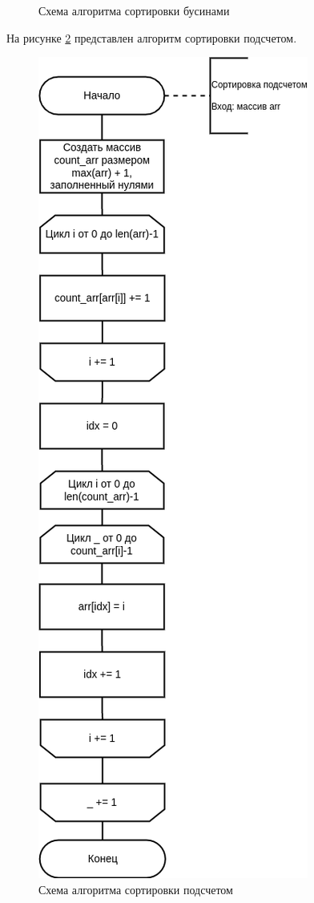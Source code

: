 \begin{figure}[H]
\begin{center}
	\end{center}
	\captionsetup{justification=centering}
	\caption{Схема алгоритма сортировки бусинами}
	\label{img:bead_sort}
\end{figure}

На рисунке \ref{img:counting_sort} представлен алгоритм сортировки подсчетом.

\begin{figure}[H]
	\begin{center}
		\includegraphics[scale=0.6]{img/counting_sort.png}
	\end{center}
	\captionsetup{justification=centering}
	\caption{Схема алгоритма сортировки подсчетом}
	\label{img:counting_sort}
\end{figure}

